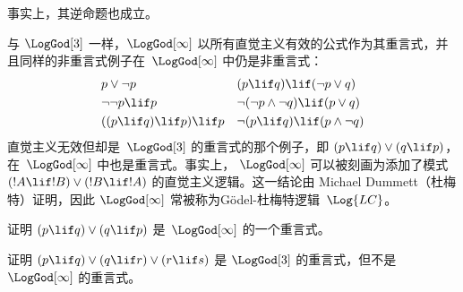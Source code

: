\documentclass[../../../include/open-logic-section]{subfiles}
\begin{document}
事实上，其逆命题也成立。

与 $\LogGod[3]$ 一样，$\LogGod[\infty]$ 以所有直觉主义有效的公式作为其重言式，并且同样的非重言式例子在~$\LogGod[\infty]$ 中仍是非重言式：
\begin{align*}
  & p \lor \lnot p && (p \lif q) \lif (\lnot p \lor q) \\
  & \lnot\lnot p \lif p && \lnot(\lnot p \land \lnot q) \lif (p \lor q) \\
  & ((p \lif q) \lif p) \lif p && \lnot(p \lif q) \lif (p \land \lnot q)
\end{align*}
直觉主义无效但却是~$\LogGod[3]$ 的重言式的那个例子，即 $(p \lif q) \lor (q \lif
p)$，在~$\LogGod[\infty]$ 中也是重言式。事实上，
$\LogGod[\infty]$ 可以被刻画为添加了模式 $(!A \lif !B) \lor (!B \lif !A)$ 的直觉主义逻辑。这一结论由 Michael Dummett（杜梅特）证明，因此 $\LogGod[\infty]$ 常被称为Gödel-杜梅特逻辑~$\Log{LC}$。

\begin{prob}
  证明 $(p \lif q) \lor (q \lif p)$ 是~$\LogGod[\infty]$ 的一个重言式。
\end{prob}

\begin{prob}
  证明 $(p \lif q) \lor (q \lif r) \lor (r \lif s)$ 是 $\LogGod[3]$ 的重言式，但不是~$\LogGod[\infty]$ 的重言式。
\end{prob}
\end{document}
